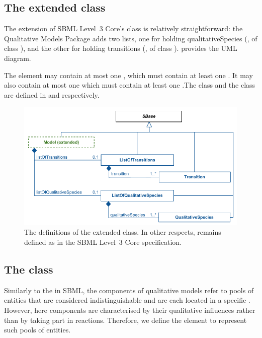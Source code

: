 \subsection{The extended  class}
\label{model-class}

The extension of SBML Level~3 Core's \Model class is relatively
straightforward: the Qualitative Models Package adds two lists,
one for holding qualitativeSpecies (, of class
\ListOfQualitativeSpecies), and the other for holding transitions (,
of class \ListOfTransitions).   provides the UML
diagram.  

\pagebreak

The  element may contain at most one \ListOfQualitativeSpecies, which must contain at least one \QualitativeSpecies. It may also contain at most one \ListOfTransitions which must contain at least one \Transition.The \QualitativeSpecies class and
the \Transition  class are defined in  and  respectively.

\begin{figure}[h!]
  \includegraphics{figs/qual-extended-model-uml.pdf}
  \caption{The definitions of the extended \Model class. In other respects, \Model remains defined as
    in the SBML Level~3 Core specification.}
  \label{qual-extended-model-uml}
\end{figure}


\subsection{The  class}
\label{qualSpecies-class}
Similarly to the  in SBML, the components of qualitative models refer to pools of entities that are considered indistinguishable and are each located in a specific . However, here components are characterised by their qualitative influences rather than by taking part in reactions. Therefore, we define the \QualitativeSpecies element to represent such pools of entities.

